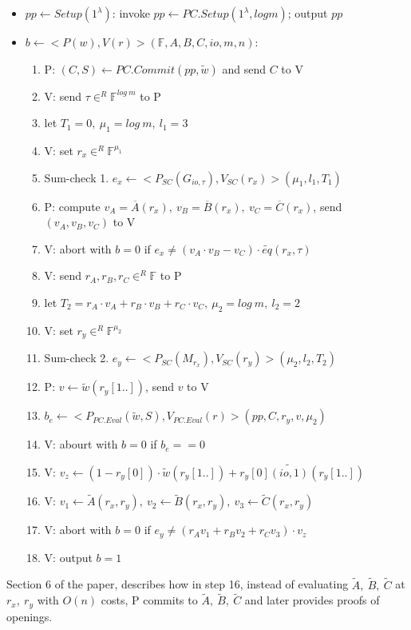 \documentclass{article}
\theoremstyle{definition}
\begin{document}
\begin{itemize}
	\item $pp \leftarrow Setup(1^{\lambda})$: invoke $pp \leftarrow PC.Setup(1^{\lambda}, log m)$; output $pp$
	\item $b \leftarrow <P(w), V(r)>(\mathbb{F}, A,B,C, io, m, n)$:
	\begin{enumerate}
		\item P: $(C, S) \leftarrow PC.Commit(pp, \widetilde{w})$ and send $C$ to V
		\item V: send $\tau \in^R \mathbb{F}^{log~m}$ to P
		\item let $T_1=0,~ \mu_1=log~m,~ l_1=3$
		\item V: set $r_x \in^R \mathbb{F}^{\mu_1}$
		\item Sum-check 1. $e_x \leftarrow <P_{SC}(G_{io,\tau}), V_{SC}(r_x)>(\mu_1, l_1, T_1)$
		\item P: compute $v_A=\overline{A}(r_x),~ v_B=\overline{B}(r_x),~ v_C=\overline{C}(r_x)$, send $(v_A, v_B, v_C)$ to V
		\item V: abort with $b=0$ if $e_x \neq (v_A \cdot v_B - v_C)\cdot \widetilde{eq}(r_x, \tau)$
		\item V: send $r_A, r_B, r_C \in^R \mathbb{F}$ to P
		\item let $T_2 = r_A \cdot v_A + r_B \cdot v_B + r_C \cdot v_C,~ \mu_2=log~m,~ l_2=2$
		\item V: set $r_y \in^R \mathbb{F}^{\mu_2}$
		\item Sum-check 2. $e_y \leftarrow <P_{SC}(M_{r_x}), V_{SC}(r_y)>(\mu_2, l_2, T_2)$
		\item P: $v \leftarrow \widetilde{w}(r_y[1..])$, send $v$ to V
		\item $b_e \leftarrow <P_{PC.Eval}(\widetilde{w}, S), V_{PC.Eval}(r)>(pp,  C, r_y, v, \mu_2)$
		\item V: abourt with $b=0$ if $b_e==0$
		\item V: $v_z \leftarrow (1 - r_y[0]) \cdot \widetilde{w}(r_y [1..]) + r_y[0] \widetilde{(io, 1)} (r_y[1..])$
		\item V: $v_1 \leftarrow \widetilde{A}(r_x, r_y),~ v_2 \leftarrow \widetilde{B}(r_x, r_y),~ v_3 \leftarrow \widetilde{C}(r_x, r_y)$
		\item V: abort with $b=0$ if $e_y \neq (r_A v_1 + r_B v_2 + r_C v_3) \cdot v_z$
		\item V: output $b=1$
	\end{enumerate}
\end{itemize}

Section 6 of the paper, describes how in step 16, instead of evaluating $\widetilde{A},~\widetilde{B},~\widetilde{C}$ at $r_x,~r_y$ with $O(n)$ costs, P commits to $\widetilde{A},~\widetilde{B},~\widetilde{C}$ and later provides proofs of openings.

\vspace{1cm}





\end{document}
